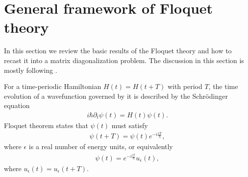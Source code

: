 \section{General framework of Floquet theory}\label{app:quantum-floquet-theory}

In this section we review the basic results of the Floquet theory and how to recast it into a matrix diagonalization problem. 
The discussion in this section is mostly following \cite{AEE}.

For a time-periodic Hamiltonian $H(t) = H(t+T)$ with period $T$, the time evolution of a wavefunction governed by it is described by the Schr\"{o}dinger equation
\begin{eqnarray}\label{eq:SchrHt}
	i\hbar \partial_t \psi(t) = H(t) \psi(t).
\end{eqnarray}
Floquet theorem states that $\psi(t)$ must satisfy
\begin{eqnarray}
	\psi(t+T) = \psi(t) e^{-i \frac{\epsilon T}{\hbar}},
\end{eqnarray}
where $\epsilon$ is a real number of energy units, or equivalently
\begin{eqnarray}
	\psi(t) = e^{-i \frac{\epsilon t}{\hbar}} u_{\epsilon}(t),
\end{eqnarray}
where $u_{\epsilon}(t) = u_{\epsilon}(t+T)$.

